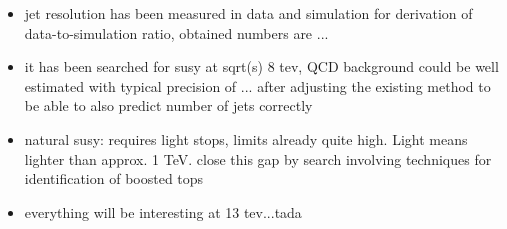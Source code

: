 \begin{itemize}
\item jet resolution has been measured in data and simulation for derivation of data-to-simulation ratio, obtained numbers are ...
\item it has been searched for susy at sqrt(s) 8 tev, QCD background could be well estimated with typical precision of ... after adjusting the existing method to be able to also predict number of jets correctly
\item natural susy: requires light stops, limits already quite high. Light means lighter than approx. 1 TeV. close this gap by search involving techniques for identification of boosted tops
\item everything will be interesting at 13 tev...tada
\end{itemize}
